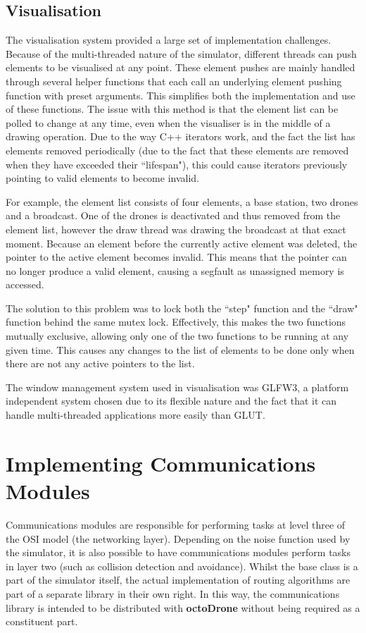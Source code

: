 	\subsection{Visualisation}
		The visualisation system provided a large set of implementation challenges. Because of the multi-threaded nature
		of the simulator, different threads can push elements to be visualised at any point. These element pushes are mainly
		handled through several helper functions that each call an underlying element pushing function with preset arguments.
		This simplifies both the implementation and use of these functions. The issue with this method is that the element list
		can be polled to change at any time, even when the visualiser is in the middle of a drawing operation. Due to the way
		C++ iterators work, and the fact the list has elements removed periodically (due to the fact that these elements are removed when they
		have exceeded their ``lifespan"), this could cause iterators previously pointing to valid elements to become invalid.

		For example, the element list consists of four elements, a base station, two drones and a broadcast. One of the drones is
		deactivated and thus removed from the element list, however the draw thread was drawing the broadcast at that exact
		moment. Because an element before the currently active element was deleted, the pointer to the active element becomes
		invalid. This means that the pointer can no longer produce a valid element, causing a segfault as unassigned
		memory is accessed.

		The solution to this problem was to lock both the ``step" function and the ``draw" function behind the same mutex lock.
		Effectively, this makes the two functions mutually exclusive, allowing only one of the two functions to be running at any
		given time. This causes any changes to the list of elements to be done only when there are not any active pointers to the
		list.

		The window management system used in visualisation was GLFW3, a platform independent system chosen due to its flexible
		nature and the fact that it can handle multi-threaded applications more easily than GLUT.

\section{Implementing Communications Modules}
Communications modules are responsible for performing tasks at level three of the OSI model\cite{normiec} (the networking layer). Depending on the noise function used by the simulator, it is also possible to have communications modules perform tasks in layer two (such as collision detection and avoidance). Whilst the base class is a part of the simulator itself, the actual implementation of routing algorithms are part of a separate library in their own right. In this way, the communications library is intended to be distributed with \textbf{octoDrone} without being required as a constituent part.

